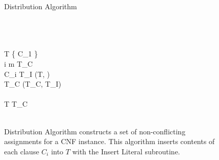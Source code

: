 
\begin{figure}[htbp]
\begin{center}

	\begin{pseudocode}{Distribution Algorithm}{\phi}
	
	\\
	\\
	\\
	T \GETS \{ C_1 \} \\
	
	\FOR i   m \DO
		\BEGIN 
			T_C \GETS \emptyset \\
		\FOREACH {} \ell {} C_i \DO
			\BEGIN
				T_I \GETS {}(T, \ell)\\
				T_C \GETS {}(T_C, T_I)\\
			\END\\
			T \GETS {}T_C\text{)} \\
		\END
	\\
	\end{pseudocode}

\caption{{\sc Distribution Algorithm} constructs a set of non-conflicting assignments for a CNF instance.  This algorithm inserts contents of each clause $C_i$ into $T$ with the {\sc Insert Literal} subroutine.}
\label{distributionAlgorithm}
\end{center}
\end{figure}

